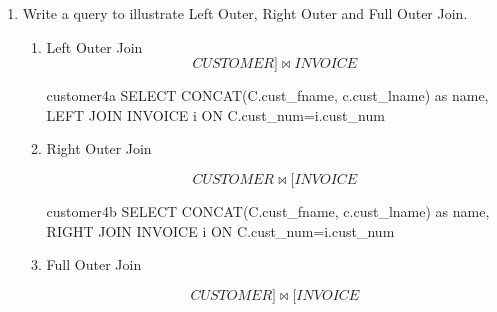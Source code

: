 \begin{enumerate}
\begin{enumerate}
                    \pagebreak

              \item SQL

                    \begin{sqlQuery}{customers3}
                        SELECT concat(cust_lname , " " , cust_fname) as name
                        FROM CUSTOMERS
                        WHERE cust_num IN
                        (
                            SELECT cust_num
                            FROM INVOICE
                            GROUP BY cust_num, inv_date, prod_num
                            HAVING sum(unit_sold) >= 3
                        )
                    \end{sqlQuery}

          \end{enumerate}

    \item Write a query to illustrate Left Outer, Right Outer and Full Outer Join.

          \begin{enumerate}
              \item Left Outer Join
                    \begin{equation*}
                        CUSTOMER ]\bowtie INVOICE
                    \end{equation*}

                    \begin{sqlQuery}{customer4a}
											SELECT CONCAT(C.cust_fname, c.cust_lname) as name,
											LEFT JOIN INVOICE i
											ON C.cust_num=i.cust_num
										\end{sqlQuery}

              \item Right Outer Join

                    \begin{equation*}
                        CUSTOMER \bowtie[ INVOICE
                    \end{equation*}

                    \begin{sqlQuery}{customer4b}
											SELECT CONCAT(C.cust_fname, c.cust_lname) as name,
											RIGHT JOIN INVOICE i 
											ON C.cust_num=i.cust_num
										\end{sqlQuery}

              \item Full Outer Join

                    \begin{equation*}
                        CUSTOMER ]\bowtie[ INVOICE
                    \end{equation*}


\end{enumerate}
\end{enumerate}
